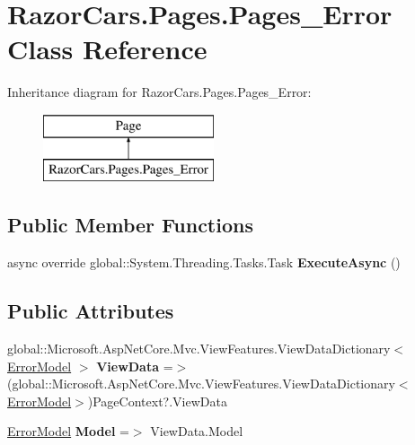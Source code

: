 \hypertarget{class_razor_cars_1_1_pages_1_1_pages___error}{}\section{Razor\+Cars.\+Pages.\+Pages\+\_\+\+Error Class Reference}
\label{class_razor_cars_1_1_pages_1_1_pages___error}
Inheritance diagram for Razor\+Cars.\+Pages.\+Pages\+\_\+\+Error\+:\begin{figure}[H]
\begin{center}
\leavevmode
\includegraphics[height=2.000000cm]{class_razor_cars_1_1_pages_1_1_pages___error}
\end{center}
\end{figure}
\subsection*{Public Member Functions}
\begin{DoxyCompactItemize}
\item 
\mbox{\label{class_razor_cars_1_1_pages_1_1_pages___error_a094c7ed451b68c92ef543f2aee5340ff}} 
async override global\+::\+System.\+Threading.\+Tasks.\+Task {\bfseries Execute\+Async} ()
\end{DoxyCompactItemize}
\subsection*{Public Attributes}
\begin{DoxyCompactItemize}
\item 
\mbox{\label{class_razor_cars_1_1_pages_1_1_pages___error_ad0013661680e07646a37b829a68fe7a9}} 
global\+::\+Microsoft.\+Asp\+Net\+Core.\+Mvc.\+View\+Features.\+View\+Data\+Dictionary$<$ \mbox{\hyperlink{class_razor_cars_1_1_pages_1_1_error_model}{Error\+Model}} $>$ {\bfseries View\+Data} =$>$ (global\+::\+Microsoft.\+Asp\+Net\+Core.\+Mvc.\+View\+Features.\+View\+Data\+Dictionary$<$\mbox{\hyperlink{class_razor_cars_1_1_pages_1_1_error_model}{Error\+Model}}$>$)Page\+Context?.View\+Data
\item 
\mbox{\label{class_razor_cars_1_1_pages_1_1_pages___error_ac8a0dfbf229722b0fc8fd52c3d58a439}} 
\mbox{\hyperlink{class_razor_cars_1_1_pages_1_1_error_model}{Error\+Model}} {\bfseries Model} =$>$ View\+Data.\+Model
\end{DoxyCompactItemize}

